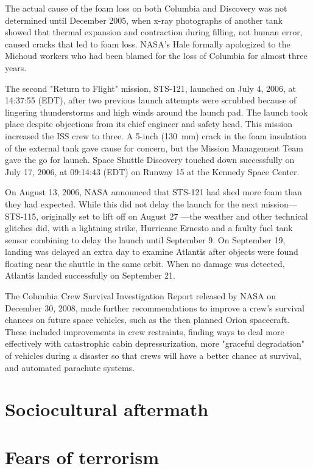 The actual cause of the foam loss on both Columbia and Discovery was not
determined until December 2005, when x-ray photographs of another tank
showed that thermal expansion and contraction during filling, not human
error, caused cracks that led to foam loss. NASA's Hale formally
apologized to the Michoud workers who had been blamed for the loss of
Columbia for almost three years.

The second "Return to Flight" mission, STS-121, launched on July 4,
2006, at 14:37:55 (EDT), after two previous launch attempts were
scrubbed because of lingering thunderstorms and high winds around the
launch pad. The launch took place despite objections from its chief
engineer and safety head. This mission increased the ISS crew to three.
A 5-inch (130~mm) crack in the foam insulation of the external tank gave
cause for concern, but the Mission Management Team gave the go for
launch. Space Shuttle Discovery touched down successfully on July 17,
2006, at 09:14:43 (EDT) on Runway 15 at the Kennedy Space Center.

On August 13, 2006, NASA announced that STS-121 had shed more foam than
they had expected. While this did not delay the launch for the next
mission---STS-115, originally set to lift off on August 27 ---the
weather and other technical glitches did, with a lightning strike,
Hurricane Ernesto and a faulty fuel tank sensor combining to delay the
launch until September 9. On September 19, landing was delayed an extra
day to examine Atlantis after objects were found floating near the
shuttle in the same orbit. When no damage was detected, Atlantis landed
successfully on September 21.

The Columbia Crew Survival Investigation Report released by NASA on
December 30, 2008, made further recommendations to improve a crew's
survival chances on future space vehicles, such as the then planned
Orion spacecraft. These included improvements in crew restraints,
finding ways to deal more effectively with catastrophic cabin
depressurization, more "graceful degradation" of vehicles during a
disaster so that crews will have a better chance at survival, and
automated parachute systems.

\section{Sociocultural aftermath}\label{sociocultural-aftermath}

\section{Fears of terrorism}\label{fears-of-terrorism}

